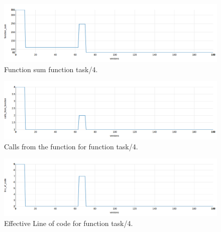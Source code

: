 \begin{figure}[ht]
	\centering
	\includegraphics[width=\textwidth]{figures/function_sum_task4.png}
	\caption{Function sum function task/4.} 
	\label{fig:function_sum_task4}
\end{figure}

\begin{figure}[ht]
	\centering
	\includegraphics[width=\textwidth]{figures/calls_from_function_task4.png}
	\caption{Calls from the function for function task/4.} 
	\label{fig:calls_from_function_task4}
\end{figure}

\begin{figure}[ht]
	\centering
	\includegraphics[width=\textwidth]{figures/task4.png}
	\caption{Effective Line of code for function task/4.} 
	\label{fig:task4}
\end{figure}